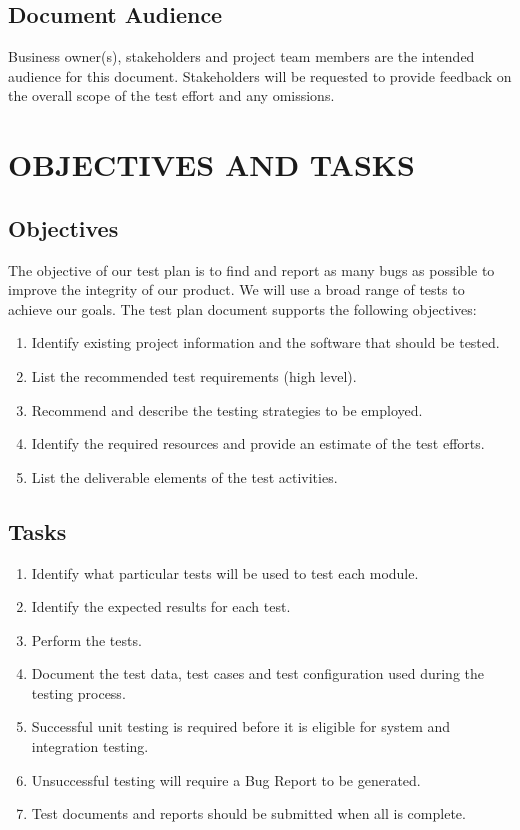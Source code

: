 \documentclass{article}
\begin{document}
\subsection{Document Audience}
Business owner(s), stakeholders and project team members are the intended audience for this document. Stakeholders will be requested to provide feedback on the overall scope of the test effort and any omissions.


\newpage

\section{OBJECTIVES AND TASKS}

\subsection{Objectives}
The objective of our test plan is to find and report as many bugs as possible to improve the integrity of our product. We will use a broad range of tests to achieve our goals. The test plan document supports the following objectives:
\begin{enumerate}
    \item Identify existing project information and the software that            should be tested.
    \item List the recommended test requirements (high level).
    \item Recommend and describe the testing strategies to be employed.
    \item Identify the required resources and provide an estimate of the         test efforts.
    \item List the deliverable elements of the test activities.
\end{enumerate}
\subsection{Tasks}
\begin{enumerate}
    \item Identify what particular tests will be used to test each module.
    \item Identify the expected results for each test.
    \item Perform the tests.    
    \item Document the test data, test cases and test configuration used during the testing process.
    \item Successful unit testing is required before it is eligible for system and integration testing.
    \item Unsuccessful testing will require a Bug Report to be generated.
    \item Test documents and reports should be submitted when all is complete.
\end{enumerate}
\end{document}
